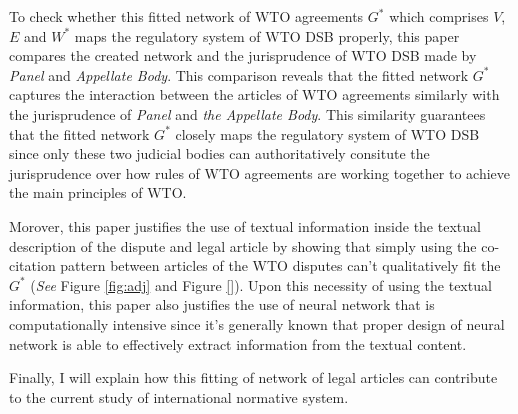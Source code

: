 To check whether this fitted network of WTO agreements $G^*$ which comprises $V$, $E$ and $W^*$ maps the regulatory system of WTO DSB properly, this paper
compares the created network and the jurisprudence of WTO DSB made by \textit{Panel} and \textit{Appellate Body}. 
This comparison reveals that the fitted network $G^*$ captures the interaction between the articles of WTO agreements
similarly with the jurisprudence of \textit{Panel} and \textit{the Appellate Body}. This similarity guarantees that the fitted network $G^*$ closely maps the regulatory system of WTO DSB since only these two judicial bodies 
can authoritatively consitute the jurisprudence over how rules of WTO agreements are working together 
to achieve the main principles of WTO.

Morover, this paper justifies the use of textual information inside the textual description of the dispute and legal article by showing that simply using the co-citation pattern between articles of the WTO disputes can't qualitatively fit the $G^*$ (\textit{See} Figure \ref{fig:adj} and Figure \ref{}). 
Upon this necessity of using the textual information, this paper also justifies the use of neural network that is computationally intensive since it's generally known that proper design of neural network is able to effectively extract information from the textual content.

Finally, I will explain how this fitting of network of legal articles can contribute to the current study of international normative system.
